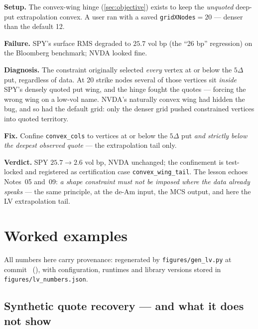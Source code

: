 \documentclass[11pt]{article}
\begin{document}
\begin{example}[title={Case file: the convex wing that flattened SPY}]
\textbf{Setup.} The convex-wing hinge (\cref{sec:objective}) exists to keep
the \emph{unquoted} deep-put extrapolation convex. A user ran with a saved
\texttt{gridXNodes}$=20$ --- denser than the default 12.

\textbf{Failure.} SPY's surface RMS degraded to $25.7$ vol bp (the ``26 bp''
regression) on the Bloomberg benchmark; NVDA looked fine.

\textbf{Diagnosis.} The constraint originally selected \emph{every} vertex at
or below the $5\Delta$ put, regardless of data. At 20 strike nodes several of
those vertices sit \emph{inside} SPY's densely quoted put wing, and the hinge
fought the quotes --- forcing the wrong wing on a low-vol name. NVDA's
naturally convex wing had hidden the bug, and so had the default grid: only
the denser grid pushed constrained vertices into quoted territory.

\textbf{Fix.} Confine \texttt{convex\_cols} to vertices at or below the
$5\Delta$ put \emph{and strictly below the deepest observed quote} --- the
extrapolation tail only.

\textbf{Verdict.} SPY $25.7\to2.6$ vol bp, NVDA unchanged; the confinement is
test-locked and registered as certification case \texttt{convex\_wing\_tail}.
The lesson echoes Notes~05 and~09: \emph{a shape constraint must
not be imposed where the data already speaks} --- the same principle, at the
de-Am input, the MCS output, and here the LV extrapolation tail.
\end{example}

\section{Worked examples}
\label{sec:examples}

All numbers here carry provenance: regenerated by
\nolinkurl{figures/gen_lv.py} at commit \texttt{\lvgencommit}\ (\lvgendate),
with configuration, runtimes and library versions stored in
\nolinkurl{figures/lv_numbers.json}.

\subsection{Synthetic quote recovery --- and what it does not show}
\end{document}
